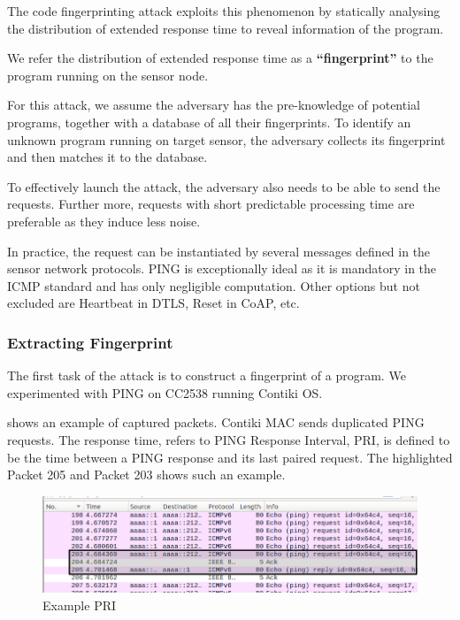 The code fingerprinting attack exploits this phenomenon by statically analysing the distribution of extended response time to reveal information of the program.

\begin{definition}
	We refer the distribution of extended response time as a \textbf{``fingerprint''} to the program running on the sensor node.
\end{definition}

For this attack, we assume the adversary has the pre-knowledge of potential programs, together with a database of all their fingerprints. To identify an unknown program running on target sensor, the adversary collects its fingerprint and then matches it to the database.

To effectively launch the attack, the adversary also needs to be able to send the requests. Further more, requests with short predictable processing time are preferable as they induce less noise. 

In practice, the request can be instantiated by several messages defined in the sensor network protocols. PING is exceptionally ideal as it is mandatory in the ICMP standard\cite{rfc4433} and has only negligible computation. Other options but not excluded are Heartbeat in DTLS\cite{rfc6520}, Reset in CoAP\cite{rfc7252}, etc.

\subsubsection{Extracting Fingerprint}
The first task of the attack is to construct a fingerprint of a program. We experimented with PING on CC2538 running Contiki OS. 

 shows an example of captured packets. Contiki MAC\cite{ContikiMAC} sends duplicated PING requests. The response time, refers to PING Response Interval, PRI, is defined to be the time between a PING response and its last paired request. The highlighted Packet 205 and Packet 203 shows such an example.

\begin{figure}[!h]
	\centering
	\includegraphics[width=\textwidth]{fig/PRI_hl.png}
	\caption{Example PRI\label{ExamplePri}}
\end{figure}

